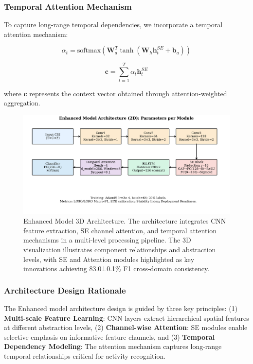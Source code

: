 \documentclass[journal]{IEEEtran}
\begin{document}
\subsubsection{Temporal Attention Mechanism}

To capture long-range temporal dependencies, we incorporate a temporal attention mechanism:

\begin{equation}
\alpha_t = \text{softmax}(\mathbf{W}_a^T \tanh(\mathbf{W}_h \mathbf{h}_t^{SE} + \mathbf{b}_a))
\end{equation}

\begin{equation}
\mathbf{c} = \sum_{t=1}^{T} \alpha_t \mathbf{h}_t^{SE}
\end{equation}

where $\mathbf{c}$ represents the context vector obtained through attention-weighted aggregation.

\begin{figure}[ht]
\centering
\includegraphics[width=\columnwidth]{figures/fig3_enhanced_model_dataflow.pdf}%
\caption{Enhanced Model 3D Architecture. The architecture integrates CNN feature extraction, SE channel attention, and temporal attention mechanisms in a multi-level processing pipeline. The 3D visualization illustrates component relationships and abstraction levels, with SE and Attention modules highlighted as key innovations achieving 83.0±0.1\% F1 cross-domain consistency.}
\label{fig:enhanced_3d_arch}
\end{figure}

\subsubsection{Architecture Design Rationale}

The Enhanced model architecture design is guided by three key principles: (1) \textbf{Multi-scale Feature Learning}: CNN layers extract hierarchical spatial features at different abstraction levels, (2) \textbf{Channel-wise Attention}: SE modules enable selective emphasis on informative feature channels, and (3) \textbf{Temporal Dependency Modeling}: The attention mechanism captures long-range temporal relationships critical for activity recognition.
\end{document}
